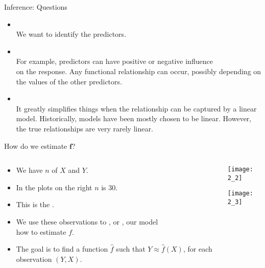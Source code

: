 \documentclass[mathserif, aspectratio=169]{beamer}
\begin{document}
\begin{frame}{Inference: Questions}
	\begin{cpage}
		\begin{itemize}
			\item {}\\
				We want to identify the  predictors.
			\item {}\\
				For example, predictors can have positive or negative influence\\
				on the response. Any functional relationship can occur, 
				possibly depending on the values of the other predictors.
			\item {}\\
				It greatly simplifies things when the relationship can be captured by a linear model.
				Historically, models have been mostly chosen to be linear. However, the true relationships
				are very rarely linear.
		\end{itemize}
	\end{cpage}
\end{frame}

\begin{frame}{How do we estimate $\bm{f}$?}
	\begin{columns}
		\begin{column}{0.7\textwidth}
			\begin{itemize}
				\item We have $n$  of $X$ and $Y$.
				\item In the plots on the right $n$ is 30.
				\item This is the .
				\item We use these observations to , or , our model\\
					how to estimate $f$.
				\item The goal is to find a function $\hat{f}$ such that $Y \approx \hat{f}(X)$,
					for each observation $(Y, X)$.
			\end{itemize}
		\end{column}
		\begin{column}{0.3\textwidth}
			\begin{center}
				\texttt{[image: 2\_2]}
			\end{center}
			\begin{center}
				\texttt{[image: 2\_3]}
			\end{center}
		\end{column}
	\end{columns}
\end{frame}
\end{document}

